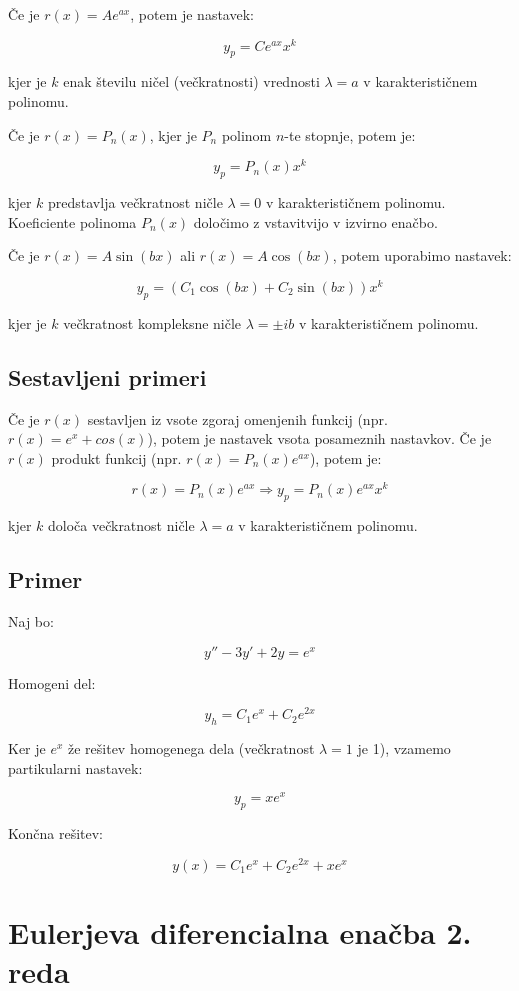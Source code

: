 \documentclass[12pt]{report}
\begin{document}
Če je $r(x) = Ae^{ax}$, potem je nastavek:

\[y_p = Ce^{ax}x^k\]

kjer je $k$ enak številu ničel (večkratnosti) vrednosti $\lambda = a$ v karakterističnem polinomu.

Če je $r(x) = P_n(x)$, kjer je $P_n$ polinom $n$-te stopnje, potem je:

\[y_p = P_n(x)x^k\]

kjer $k$ predstavlja večkratnost ničle $\lambda = 0$ v karakterističnem polinomu. Koeficiente polinoma $P_n(x)$
določimo z vstavitvijo v izvirno enačbo.

Če je $r(x) = A \sin(bx)$ ali $r(x) = A \cos(bx)$, potem uporabimo nastavek:

\[y_p = (C_1 \cos(bx) + C_2 \sin(bx))x^k\]

kjer je $k$ večkratnost kompleksne ničle $\lambda = \pm ib$ v karakterističnem polinomu.


\subsection*{Sestavljeni primeri}
Če je $r(x)$ sestavljen iz vsote zgoraj omenjenih funkcij (npr. $r(x) = e^x + cos(x)$), potem je nastavek vsota
posameznih nastavkov.
Če je $r(x)$ produkt funkcij (npr. $r(x) = P_n(x)e^{ax}$), potem je:

\[r(x) = P_n(x)e^{ax} \Rightarrow y_p = P_n(x)e^{ax}x^k \]

kjer $k$ določa večkratnost ničle $\lambda = a$ v karakterističnem polinomu.


\subsection*{Primer}

Naj bo:

\[y'' - 3y' + 2y = e^x\]

Homogeni del:

\[y_h = C_1e^x + C_2e^{2x}\]
 
Ker je $e^x$ že rešitev homogenega dela (večkratnost $\lambda = 1$ je 1), vzamemo partikularni nastavek:

\[ y_p = xe^x\]

Končna rešitev:

\[ y(x) = C_1e^x + C_2e^{2x} + xe^x\]



\section*{Eulerjeva diferencialna enačba 2. reda}
\end{document}
